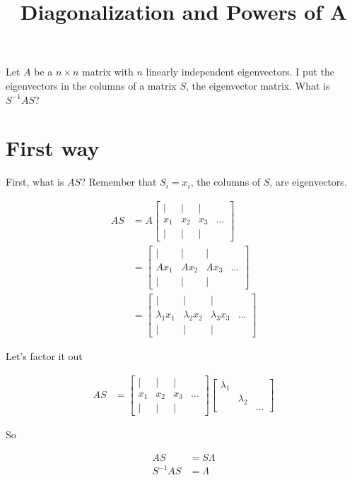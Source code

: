 \documentclass{article}
\title{Diagonalization and Powers of A}
\date{}
\begin{document}
\maketitle

Let $A$ be a $n \times n$ matrix with $n$ linearly independent eigenvectors. I put the eigenvectors in the columns of a matrix $S$, the eigenvector matrix. What is $S^{-1} A S$?

\section{First way}
First, what is $AS$? Remember that $S_i = x_i$, the columns of $S$, are eigenvectors.

\begin{align}
AS &= A
\begin{bmatrix}
\vert  & \vert & \vert \\
x_1 & x_2 & x_3 & ... \\
\vert & \vert & \vert
\end{bmatrix} \\
&= 
\begin{bmatrix}
\vert  & \vert & \vert \\
Ax_1 & Ax_2 & Ax_3 & ... \\
\vert & \vert & \vert
\end{bmatrix} \\
&=
\begin{bmatrix}
\vert  & \vert & \vert \\
\lambda_1x_1 & \lambda_2x_2 & \lambda_3x_3 & ... \\
\vert & \vert & \vert
\end{bmatrix}
\end{align}

Let's factor it out

\begin{align}
AS &=
\begin{bmatrix}
\vert  & \vert & \vert \\
x_1 & x_2 & x_3 & ... \\
\vert & \vert & \vert
\end{bmatrix}
\begin{bmatrix}
\lambda_1 \\
 & \lambda_2 \\
& & ...
\end{bmatrix}
\end{align}

So

\begin{align}
AS &= S\Lambda \\
S^{-1}AS &= \Lambda
\end{align}
\end{document}
